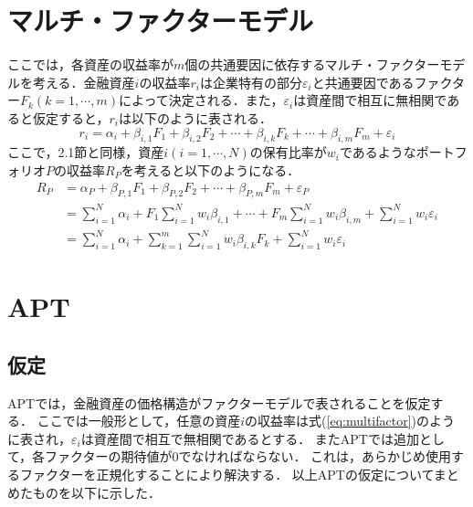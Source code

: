 \documentclass[11pt]{jreport}
\begin{document}
\section{マルチ・ファクターモデル}
ここでは，各資産の収益率が$m$個の共通要因に依存するマルチ・ファクターモデルを考える．金融資産$i$の収益率$r_i$は企業特有の部分$\varepsilon_i$と共通要因であるファクター$F_k(k=1,\cdots,m)$によって決定される．また，$\varepsilon_i$は資産間で相互に無相関であると仮定すると，$r_i$は以下のように表される．
\begin{equation}
r_i = \alpha_i + \beta_{i,1}F_1 + \beta_{i,2}F_2 + \cdots + \beta_{i,k}F_k + \cdots + \beta_{i,m}F_m + \varepsilon_i
\label{eq:multifactor}
\end{equation}
ここで，2.1節と同様，資産$i(i=1,\cdots,N)$の保有比率が$w_i$であるようなポートフォリオ$P$の収益率$R_P$を考えると以下のようになる．
\begin{equation}
\begin{split}
R_P &= \alpha_P + \beta_{P,1} F_1 + \beta_{P,2} F_2 + \cdots + \beta_{P,m} F_m + \varepsilon_P\\
&=\sum_{i=1}^N \alpha_i + F_1 \sum_{i=1}^N w_i \beta_{i,1} + \cdots + F_m \sum_{i=1}^N w_i \beta_{i,m} + \sum_{i=1}^N w_i\varepsilon_i\\
&= \sum_{i=1}^N \alpha_i + \sum_{k=1}^m \sum_{i=1}^N w_i \beta_{i,k} F_k + \sum_{i=1}^N w_i\varepsilon_i
\label{eq:multi}
\end{split}
\end{equation}


\section{APT}

\subsection{仮定}
APTでは，金融資産の価格構造がファクターモデルで表されることを仮定する．
ここでは一般形として，任意の資産$i$の収益率は式(\ref{eq:multifactor})のように表され，$\varepsilon_i$は資産間で相互で無相関であるとする．
またAPTでは追加として，各ファクターの期待値が0でなければならない．
これは，あらかじめ使用するファクターを正規化することにより解決する．
以上APTの仮定についてまとめたものを以下に示した．
\end{document}

